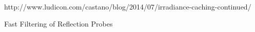 http://www.ludicon.com/castano/blog/2014/07/irradiance-caching-continued/


Fast Filtering of Reflection Probes

